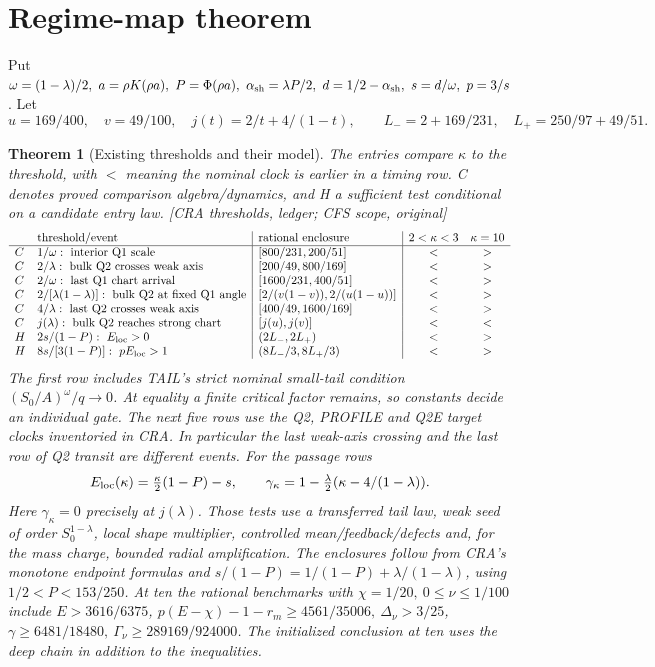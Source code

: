 \documentclass[11pt]{article}
\newtheorem{theorem}{Theorem}\newtheorem{lemma}{Composition lemma}
\newcommand{\src}[1]{\textnormal{\small[#1]}}
\begin{document}
\section{Regime-map theorem}\label{an04rmsv1:regimes}
Put \(\omega=(1-\lambda)/2,\ a=\rho K(\rho a),\
P=\Phi(\rho a),\ \alpha_{\rm sh}=\lambda P/2,\ d=1/2-\alpha_{\rm sh},\
s=d/\omega,\ p=3/s\). Let
\[
 u=169/400,\quad v=49/100,\quad j(t)=2/t+4/(1-t),\qquad
 L_-=2+169/231,\quad L_+=250/97+49/51 .
\]
\begin{theorem}[Existing thresholds and their model]\label{an04rmsv1:map}
The entries compare \(\kappa\) to the threshold, with \(<\) meaning
the nominal clock is earlier in a timing row. C denotes proved
comparison algebra/dynamics, and H a sufficient test conditional on a
candidate entry law. \src{CRA thresholds, ledger; CFS scope, original}
\[
\begin{array}{ll|l|cc}
 &\text{threshold/event}&\text{rational enclosure}
       &2<\kappa<3&\kappa=10\\\hline
 C&1/\omega:\ \text{interior Q1 scale}&[800/231,200/51]&<&>\\
 C&2/\lambda:\ \text{bulk Q2 crosses weak axis}&[200/49,800/169]&<&>\\
 C&2/\omega:\ \text{last Q1 chart arrival}&[1600/231,400/51]&<&>\\
 C&2/[\lambda(1-\lambda)]:\ \text{bulk Q2 at fixed Q1 angle}
 &[2/(v(1-v)),2/(u(1-u))]&<&>\\
 C&4/\lambda:\ \text{last Q2 crosses weak axis}&[400/49,1600/169]&<&>\\
 C&j(\lambda):\ \text{bulk Q2 reaches strong chart}&[j(u),j(v)]&<&<\\
 H&2s/(1-P):\ E_{\rm loc}>0&(2L_-,2L_+)&<&>\\
 H&8s/[3(1-P)]:\ pE_{\rm loc}>1&(8L_-/3,8L_+/3)&<&>
\end{array}
\]
The first row includes TAIL's strict nominal small-tail condition
\((S_0/A)^\omega/q\to0\). At equality a finite critical factor
remains, so constants decide an individual gate. The next five rows
use the Q2, PROFILE and Q2E target clocks inventoried in CRA.
In particular the last weak-axis crossing and the last row of Q2
transit are different events. For the passage rows
\[
 E_{\rm loc}(\kappa)=\tfrac{\kappa}{2}(1-P)-s,\qquad
 \gamma_\kappa=1-\tfrac{\lambda}{2}(\kappa-4/(1-\lambda)).
\]
Here \(\gamma_\kappa=0\) precisely at \(j(\lambda)\). Those tests
use a transferred tail law, weak seed of order \(S_0^{1-\lambda}\),
local shape multiplier, controlled mean/feedback/defects and, for
the mass charge, bounded radial amplification. The enclosures follow
from CRA's monotone endpoint formulas and
\(s/(1-P)=1/(1-P)+\lambda/(1-\lambda)\), using
\(1/2<P<153/250\). At ten the rational benchmarks with
\(\chi=1/20,\ 0\le\nu\le1/100\) include \(E>3616/6375\),
\(p(E-\chi)-1-r_m\ge4561/35006,\ \Delta_\nu>3/25\),
\(\gamma\ge6481/18480,\ \Gamma_\nu\ge289169/924000\).
The initialized conclusion at ten uses the deep chain in addition
to the inequalities.
\end{theorem}
\end{document}
